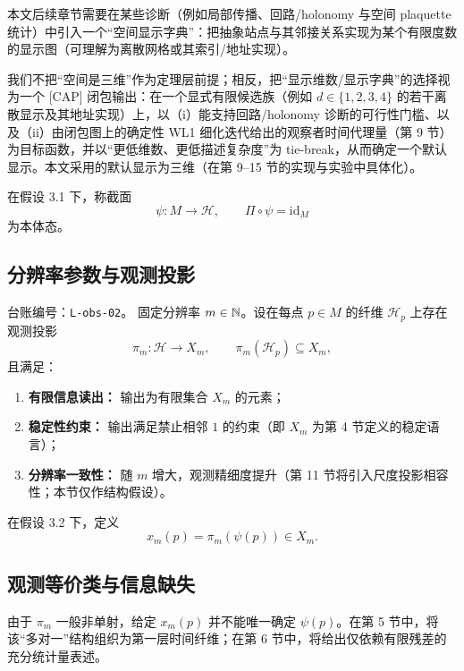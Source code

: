 \begin{remark}[三维作为显示输出而非先验前提]\label{rem:3d_as_cap_output}
\InterfaceTag
本文后续章节需要在某些诊断（例如局部传播、回路/holonomy 与空间 plaquette 统计）中引入一个“空间显示字典”：把抽象站点与其邻接关系实现为某个有限度数的显示图（可理解为离散网格或其索引/地址实现）。\par

\AuditTag 我们不把“空间是三维”作为定理层前提；相反，把“显示维数/显示字典”的选择视为一个 \textsf{[CAP]} 闭包输出：在一个显式有限候选族（例如 $d\in\{1,2,3,4\}$ 的若干离散显示及其地址实现）上，以（i）能支持回路/holonomy 诊断的可行性门槛、以及（ii）由闭包图上的确定性 WL1 细化迭代给出的观察者时间代理量（第 9 节）为目标函数，并以“更低维数、更低描述复杂度”为 tie-break，从而确定一个默认显示。本文采用的默认显示为三维（在第 9--15 节的实现与实验中具体化）。
\end{remark}

\begin{definition}[本体态]
在假设 3.1 下，称截面
$$
\psi:M\to \mathcal H,\qquad \Pi\circ \psi=\mathrm{id}_M
$$
为本体态。
\end{definition}

\subsection{分辨率参数与观测投影}

\begin{assumption}[观测投影与分辨率]\label{ass:observation_projection}
\InterfaceTag
\AuditTag 台账编号：\texttt{L-obs-02}。
固定分辨率 $m\in\mathbb{N}$。设在每点 $p\in M$ 的纤维 $\mathcal H_p$ 上存在观测投影
$$
\pi_m:\mathcal H\to X_m,
\qquad
\pi_m(\mathcal H_p)\subseteq X_m,
$$
且满足：
\begin{enumerate}
  \item \textbf{有限信息读出：} 输出为有限集合 $X_m$ 的元素；
  \item \textbf{稳定性约束：} 输出满足禁止相邻 $1$ 的约束（即 $X_m$ 为第 4 节定义的稳定语言）；
  \item \textbf{分辨率一致性：} 随 $m$ 增大，观测精细度提升（第 11 节将引入尺度投影相容性；本节仅作结构假设）。
\end{enumerate}
\end{assumption}

\begin{definition}
在假设 3.2 下，定义
$$
x_m(p)=\pi_m(\psi(p))\in X_m.
$$
\end{definition}

\subsection{观测等价类与信息缺失}

由于 $\pi_m$ 一般非单射，给定 $x_m(p)$ 并不能唯一确定 $\psi(p)$。在第 5 节中，将该“多对一”结构组织为第一层时间纤维；在第 6 节中，将给出仅依赖有限残差的充分统计量表述。
